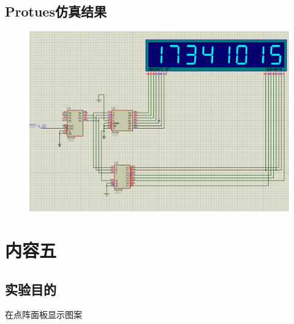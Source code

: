 \documentclass[11pt,UTF8]{ctexart}
\begin{document}
\subsection{Protues仿真结果}
\begin{figure}[H]
    \centering
    \includegraphics[width=0.9\linewidth]{fig/num.PNG}
\end{figure}


\section{内容五}
\subsection{实验目的}
在点阵面板显示图案
\end{document}
